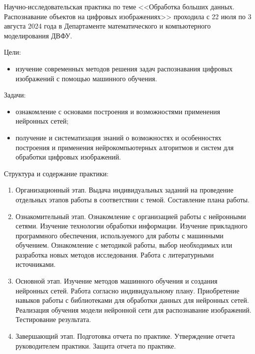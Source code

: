 \documentclass[../document.tex]{subfiles}
\begin{document}
\par Научно-исследовательская практика по теме <<Обработка больших данных. Распознавание объектов на цифровых изображениях>> проходила с 22 июля по 3 августа 2024 года в Департаменте математического и компьютерного моделирования ДВФУ.
\par Цели:
\begin{itemize}
    \item изучение современных методов решения задач распознавания цифровых изображений с помощью машинного обучения.
\end{itemize}
\par Задачи:
\begin{itemize}
    \item ознакомление с основами построения и возможностями применения нейронных сетей;
    \item получение и систематизация знаний о возможностях и особенностях построения и применения нейрокомпьютерных алгоритмов и систем для обработки цифровых изображений.
\end{itemize}
\par Структура и содержание практики:
\begin{enumerate}
    \item Организационный этап. Выдача индивидуальных заданий на проведение отдельных этапов работы в соответствии с темой. Составление плана работы.
    \item Ознакомительный этап. Ознакомление с организацией работы с нейронными сетями. Изучение технологии обработки информации. Изучение прикладного программного обеспечения, используемого для работы с машинными обучением. Ознакомление с методикой работы, выбор необходимых или разработка новых методов исследования. Работа с литературными источниками.
    \item Основной этап. Изучение методов машинного обучения и создания нейронных сетей. Работа согласно индивидуальному плану. Приобретение навыков работы с библиотеками для обработки данных для нейронных сетей. Реализация обучения модели нейронной сети для распознавание изображений. Тестирование результата.
    \item Завершающий этап. Подготовка отчета по практике. Утверждение отчета руководителем практики. Защита отчета по практике.
\end{enumerate}
\end{document}
